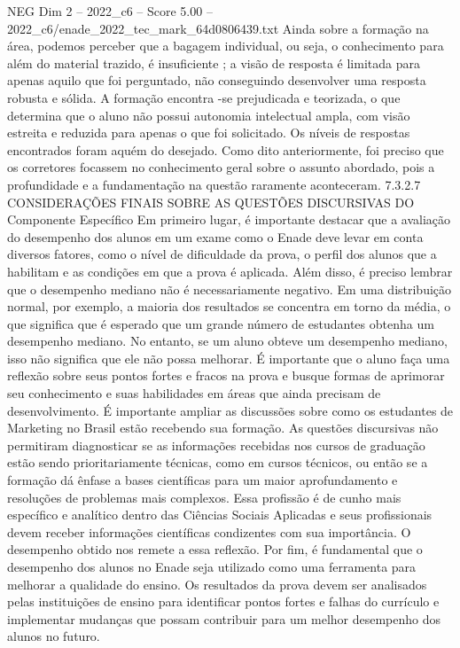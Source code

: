 \begin{textsample}{NEG Dim 2 – 2022\_c6 – Score 5.00 – 2022\_c6/enade\_2022\_tec\_mark\_64d0806439.txt}
Ainda sobre a formação na área, podemos perceber que a bagagem individual, ou seja, o conhecimento para além do material trazido, é insuficiente ; a visão de resposta é limitada para apenas aquilo que foi perguntado, não conseguindo desenvolver uma resposta robusta e sólida.
A formação encontra -se prejudicada e teorizada, o que determina que o aluno não possui autonomia intelectual ampla, com visão estreita e reduzida para apenas o que foi solicitado.
Os níveis de respostas encontrados foram aquém do desejado.
Como dito anteriormente, foi preciso que os corretores focassem no conhecimento geral sobre o assunto abordado, pois a profundidade e a fundamentação na questão raramente aconteceram. 7.3.2.7 CONSIDERAÇÕES FINAIS SOBRE AS QUESTÕES DISCURSIVAS DO Componente Específico Em primeiro lugar, é importante destacar que a avaliação do desempenho dos alunos em um exame como o Enade deve levar em conta diversos fatores, como o nível de dificuldade da prova, o perfil dos alunos que a habilitam e as condições em que a prova é aplicada.
Além disso, é preciso lembrar que o desempenho mediano não é necessariamente negativo.
Em uma distribuição normal, por exemplo, a maioria dos resultados se concentra em torno da média, o que significa que é esperado que um grande número de estudantes obtenha um desempenho mediano.
No entanto, se um aluno obteve um desempenho mediano, isso não significa que ele não possa melhorar.
É importante que o aluno faça uma reflexão sobre seus pontos fortes e fracos na prova e busque formas de aprimorar seu conhecimento e suas habilidades em áreas que ainda precisam de desenvolvimento.
É importante ampliar as discussões sobre como os estudantes de Marketing no Brasil estão recebendo sua formação.
As questões discursivas não permitiram diagnosticar se as informações recebidas nos cursos de graduação estão sendo prioritariamente técnicas, como em cursos técnicos, ou então se a formação dá ênfase a bases científicas para um maior aprofundamento e resoluções de problemas mais complexos.
Essa profissão é de cunho mais específico e analítico dentro das Ciências Sociais Aplicadas e seus profissionais devem receber informações científicas condizentes com sua importância.
O desempenho obtido nos remete a essa reflexão.
Por fim, é fundamental que o desempenho dos alunos no Enade seja utilizado como uma ferramenta para melhorar a qualidade do ensino.
Os resultados da prova devem ser analisados pelas instituições de ensino para identificar pontos fortes e falhas do currículo e implementar mudanças que possam contribuir para um melhor desempenho dos alunos no futuro.

\end{textsample}
